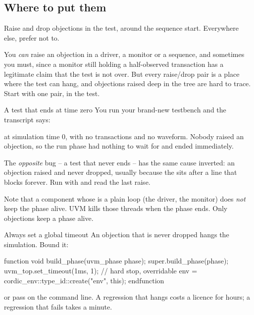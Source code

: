 \subsection{Where to put them}

\begin{ruleofthumb}
Raise and drop objections in the test, around the sequence start. Everywhere
else, prefer not to.
\end{ruleofthumb}

You \emph{can} raise an objection in a driver, a monitor or a sequence, and
sometimes you must, since a monitor still holding a half-observed transaction
has a legitimate claim that the test is not over. But every
raise/drop pair is a place where the test can hang, and objections raised
deep in the tree are hard to trace. Start with one pair, in the test.

\begin{gotcha}{A test that ends at time zero}
%
You run your brand-new testbench and the transcript says:


at simulation time 0, with no transactions and no waveform. Nobody raised an
objection, so the run phase had nothing to wait for and ended immediately.

The \emph{opposite} bug -- a test that never ends -- has the same cause
inverted: an objection raised and never dropped, usually because the
 sits after a line that blocks forever. Run with
 and read the last raise.

Note that a component whose  is a plain  loop
(the driver, the monitor) does \emph{not} keep the phase alive. UVM kills
those threads when the phase ends. Only objections keep a phase alive.
\end{gotcha}

\begin{tipbox}{Always set a global timeout}
An objection that is never dropped hangs the simulation. Bound it:

\begin{uvmcode}
function void build_phase(uvm_phase phase);
  super.build_phase(phase);
  uvm_top.set_timeout(1ms, 1);   // hard stop, overridable
  env = cordic_env::type_id::create("env", this);
endfunction
\end{uvmcode}

or pass  on the command line. A regression that
hangs costs a licence for hours; a regression that fails takes a minute.
\end{tipbox}

